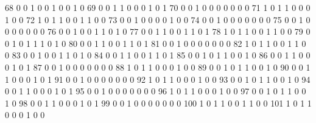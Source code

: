 \documentclass[compress,8pt]{beamer}
\begin{document}
\begin{frame}
\begin{Schunk}
  68       0       0   1              0        0    1       0       0   1   0
  69       0       0   1              1        0    0       0       1   0   1
  70       0       0   1              0        0    0       0       0   0   0
  71       1       0   1              1        0    0       0       1   0   0
  72       1       0   1              1        0    0       1       1   0   0
  73       0       0   1              0        0    0       0       1   0   0
  74       0       0   1              0        0    0       0       0   0   0
  75       0       0   1              0        0    0       0       0   0   0
  76       0       0   1              0        0    1       1       0   1   0
  77       0       0   1              1        0    0       1       1   0   1
  78       1       0   1              1        0    0       1       1   0   0
  79       0       0   1              0        1    1       1       0   1   0
  80       0       0   1              1        0    0       1       1   0   1
  81       0       0   1              0        0    0       0       0   0   0
  82       1       0   1              1        0    0       1       1   0   0
  83       0       0   1              0        0    1       1       0   1   0
  84       0       0   1              1        0    0       1       1   0   1
  85       0       0   1              0        1    1       0       0   1   0
  86       0       0   1              1        0    0       0       1   0   1
  87       0       0   1              0        0    0       0       0   0   0
  88       1       0   1              1        0    0       0       1   0   0
  89       0       0   1              0        1    1       0       0   1   0
  90       0       0   1              1        0    0       0       1   0   1
  91       0       0   1              0        0    0       0       0   0   0
  92       1       0   1              1        0    0       0       1   0   0
  93       0       0   1              0        1    1       0       0   1   0
  94       0       0   1              1        0    0       0       1   0   1
  95       0       0   1              0        0    0       0       0   0   0
  96       1       0   1              1        0    0       0       1   0   0
  97       0       0   1              0        1    1       0       0   1   0
  98       0       0   1              1        0    0       0       1   0   1
  99       0       0   1              0        0    0       0       0   0   0
  100      1       0   1              1        0    0       1       1   0   0
  101      1       0   1              1        0    0       0       1   0   0

\end{Schunk}
\end{frame}
\end{document}
